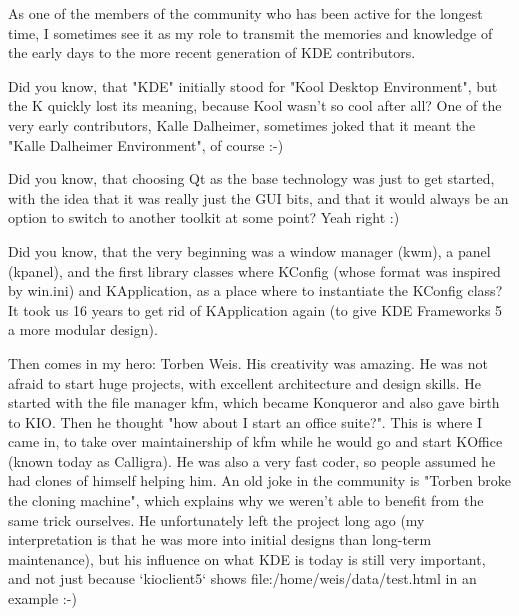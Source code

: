 

\noindent{}As one of the members of the community who has been active for the longest time, I sometimes see it as my role to transmit the memories and knowledge of the early days to the more recent generation of KDE contributors.

Did you know, that "KDE" initially stood for "Kool Desktop Environment", but the K quickly lost its meaning, because Kool wasn't so cool after all?
One of the very early contributors, Kalle Dalheimer, sometimes joked that it meant the "Kalle Dalheimer Environment", of course :-)

Did you know, that choosing Qt as the base technology was just to get started, with the idea that it was really just the GUI bits, and that it would always be an option to switch to another toolkit at some point? Yeah right :)

Did you know, that the very beginning was a window manager (kwm), a panel (kpanel), and the first library classes where KConfig (whose format was inspired by win.ini) and KApplication, as a place where to instantiate the KConfig class? It took us 16 years to get rid of KApplication again (to give KDE Frameworks 5 a more modular design).

Then comes in my hero: Torben Weis. His creativity was amazing. He was not afraid to start huge projects, with excellent architecture and design skills. He started with the file manager kfm, which became Konqueror and also gave birth to KIO. Then he thought "how about I start an office suite?". This is where I came in, to take over maintainership of kfm while he would go and start KOffice (known today as Calligra).
He was also a very fast coder, so people assumed he had clones of himself helping him. An old joke in the community is "Torben broke the cloning machine", which explains why we weren't able to benefit from the same trick ourselves.
He unfortunately left the project long ago (my interpretation is that he was more into initial designs than long-term maintenance), but his influence on what KDE is today is still very important, and not just because `kioclient5` shows file:/home/weis/data/test.html in an example :-)

